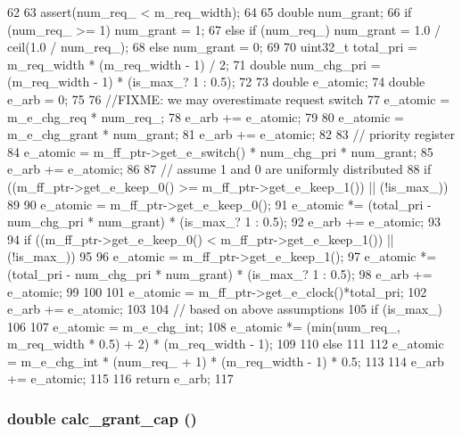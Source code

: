 \begin{DoxyCode}
62 {
63     assert(num_req_ < m_req_width);
64 
65     double num_grant;
66     if (num_req_ >= 1) num_grant = 1;
67     else if (num_req_) num_grant = 1.0 / ceil(1.0 / num_req_);
68     else num_grant = 0;
69 
70     uint32_t total_pri = m_req_width * (m_req_width - 1) / 2;
71     double num_chg_pri = (m_req_width - 1) * (is_max_? 1 : 0.5);
72 
73     double e_atomic;
74     double e_arb = 0;
75 
76     //FIXME: we may overestimate request switch
77     e_atomic = m_e_chg_req * num_req_;
78     e_arb += e_atomic;
79 
80     e_atomic = m_e_chg_grant * num_grant;
81     e_arb += e_atomic;
82 
83     // priority register
84     e_atomic = m_ff_ptr->get_e_switch() * num_chg_pri * num_grant;
85     e_arb += e_atomic;
86 
87     // assume 1 and 0 are uniformly distributed
88     if ((m_ff_ptr->get_e_keep_0() >= m_ff_ptr->get_e_keep_1()) || (!is_max_))
89     {
90         e_atomic = m_ff_ptr->get_e_keep_0();
91         e_atomic *= (total_pri - num_chg_pri * num_grant) * (is_max_? 1 : 0.5);
92         e_arb += e_atomic;
93     }
94     if ((m_ff_ptr->get_e_keep_0() < m_ff_ptr->get_e_keep_1()) || (!is_max_))
95     {
96         e_atomic = m_ff_ptr->get_e_keep_1();
97         e_atomic *= (total_pri - num_chg_pri * num_grant) * (is_max_? 1 : 0.5);
98         e_arb += e_atomic;
99     }
100 
101     e_atomic = m_ff_ptr->get_e_clock()*total_pri;
102     e_arb += e_atomic;
103 
104     // based on above assumptions
105     if (is_max_)
106     {
107         e_atomic = m_e_chg_int;
108         e_atomic *= (min(num_req_, m_req_width * 0.5) + 2) * (m_req_width - 1);
109     }
110     else
111     {
112         e_atomic = m_e_chg_int * (num_req_ + 1) * (m_req_width - 1) * 0.5;
113     }
114     e_arb += e_atomic;
115 
116     return e_arb;
117 }
\end{DoxyCode}
\hypertarget{classMatrixArbiter_a1ca031abb0d310b02168d439e1e858d2}{
\subsubsection[{calc\_\-grant\_\-cap}]{\setlength{\rightskip}{0pt plus 5cm}double calc\_\-grant\_\-cap ()}}
\label{classMatrixArbiter_a1ca031abb0d310b02168d439e1e858d2}




